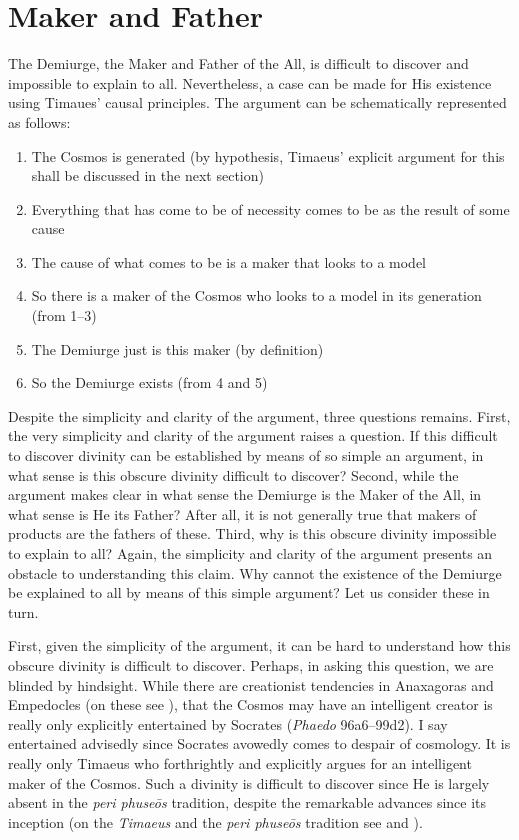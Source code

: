 \section{Maker and Father} %
\label{sec:maker_and_father}

The Demiurge, the Maker and Father of the All, is difficult to discover and impossible to explain to all. Nevertheless, a case can be made for His existence using Timaues' causal principles. The argument can be schematically represented as follows:
\begin{enumerate}[(1)]
	\item The Cosmos is generated (by hypothesis, Timaeus' explicit argument for this shall be discussed in the next section)
	\item Everything that has come to be of necessity comes to be as the result of some cause
	\item The cause of what comes to be is a maker that looks to a model
	\item So there is a maker of the Cosmos who looks to a model in its generation (from 1--3)
	\item The Demiurge just is this maker (by definition)
	\item So the Demiurge exists (from 4 and 5)
\end{enumerate}

Despite the simplicity and clarity of the argument, three questions remains. First, the very simplicity and clarity of the argument raises a question. If this difficult to discover divinity can be established by means of so simple an argument, in what sense is this obscure divinity difficult to discover? Second, while the argument makes clear in what sense the Demiurge is the Maker of the All, in what sense is He its Father? After all, it is not generally true that makers of products are the fathers of these. Third, why is this obscure divinity impossible to explain to all? Again, the simplicity and clarity of the argument presents an obstacle to understanding this claim. Why cannot the existence of the Demiurge be explained to all by means of this simple argument? Let us consider these in turn.

First, given the simplicity of the argument, it can be hard to understand how this obscure divinity is difficult to discover. Perhaps, in asking this question, we are blinded by hindsight. While there are creationist tendencies in Anaxagoras and Empedocles (on these see \citealt[chapters 1 and 2]{Sedley:2007pi}), that the Cosmos may have an intelligent creator is really only explicitly entertained by Socrates (\emph{Phaedo} 96a6–99d2). I say entertained advisedly since Socrates avowedly comes to despair of cosmology. It is really only Timaeus who forthrightly and explicitly argues for an intelligent maker of the Cosmos. Such a divinity is difficult to discover since He is largely absent in the \emph{peri phuseōs} tradition, despite the remarkable advances since its inception (on the \emph{Timaeus} and the \emph{peri phuseōs} tradition see \citealt{Naddaf:1997jt} and \citealt{Runia:1997vz}).

